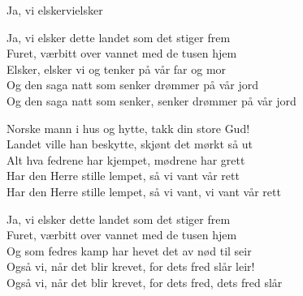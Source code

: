 \begin{song}{Ja, vi elsker}{vielsker}
\begin{vers}
Ja, vi elsker dette landet som det stiger frem\\
Furet, værbitt over vannet med de tusen hjem\\
Elsker, elsker vi og tenker på vår far og mor\\
Og den saga natt som senker drømmer på vår jord\\
Og den saga natt som senker, senker drømmer på vår jord\\
\end{vers}
\begin{vers}
Norske mann i hus og hytte, takk din store Gud!\\
Landet ville han beskytte, skjønt det mørkt så ut\\
Alt hva fedrene har kjempet, mødrene har grett\\
Har den Herre stille lempet, så vi vant vår rett\\
Har den Herre stille lempet, så vi vant, vi vant vår rett\\
\end{vers}
\begin{vers}
Ja, vi elsker dette landet som det stiger frem\\
Furet, værbitt over vannet med de tusen hjem\\
Og som fedres kamp har hevet det av nød til seir\\
Også vi, når det blir krevet, for dets fred slår leir!\\
Også vi, når det blir krevet, for dets fred, dets fred slår \\
\end{vers}
\end{song}
